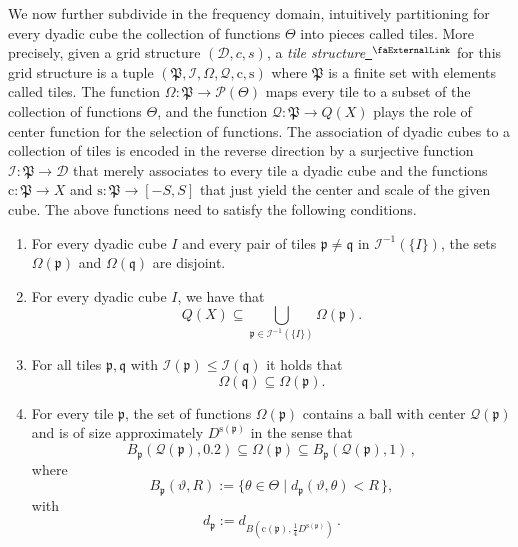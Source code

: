 \documentclass[12pt]{amsart}
\newcommand{\extlink}{~\ensuremath{{}^\text{\faExternalLink}}}
\theoremstyle{definition}
\theoremstyle{plain}
\newcommand{\pc}{{\mathrm{c}}}
\newcommand{\ps}{{\mathrm{s}}}
\newcommand{\fc}{{\Omega}}
\newcommand{\scI}{{\mathcal{I}}} %
\newcommand{\tQ}{{Q}}
\newcommand{\mfa}{{\vartheta}}
\newcommand{\mfb}{{\theta}}
\newcommand{\Mf}{{\Theta}}
\newcommand{\fcc}{{\mathcal{Q}}}
\newcommand{\fp}{{\mathfrak p}}
\newcommand{\fP}{{\mathfrak P}}
\newcommand{\fq}{{\mathfrak q}}
\begin{document}
We now further subdivide in the frequency domain, intuitively partitioning for every dyadic cube the collection of functions $\Theta$ into pieces called tiles. More precisely, given a grid structure $(\mathcal{D}, c, s)$, a \emph{tile structure}\href{https://github.com/fpvandoorn/carleson/blob/3e96104fa4cd6d5ff37434ac39c49604c86a7658/Carleson/TileStructure.lean#L54}{\extlink} for this grid structure is a tuple $(\fP,\scI,\fc,\fcc,\pc,\ps)$ where $\fP$ is a finite set with elements called tiles. The function $\fc\colon \fP \to \mathcal{P}(\Mf)$ maps every tile to a subset of the collection of functions $\Theta$, and the function $\fcc\colon \fP \to \tQ(X)$ plays the role of center function for the selection of functions. The association of dyadic cubes to a collection of tiles is encoded in the reverse direction by a surjective function $\scI: \fP \to \mathcal{D}$ that merely associates to every tile a dyadic cube and the functions $\pc\colon \fP \to X$ and $\ps\colon \fP \to [-S, S]$ that just yield the center and scale of the given cube. The above functions need to satisfy the following conditions.

\begin{enumerate}[label=\roman*.]
\item \label{it:omega-disjoint} For every dyadic cube $I$ and every pair of tiles $\fp \neq \fq$ in $\scI^{-1}(\{I\})$, the sets $\fc(\fp)$ and $\fc(\fq)$ are disjoint.
\item \label{it:omega-cover} For every dyadic cube $I$, we have that
\begin{equation}
    \tQ(X)\subseteq \bigcup_{\fp\in \scI^{-1}(\{I\})}\fc(\fp).
\end{equation}
\item For all tiles $\fp, \fq$ with $\scI(\fp) \le \scI(\fq)$ it holds that
\begin{equation}
    \fc(\fq)\subseteq \fc(\fp) .
\end{equation}
\item For every tile $\fp$, the set of functions $\fc(\fp)$ contains a ball with center $\fcc(\fp)$ and is of size approximately $D^{\ps(\fp)}$ in the sense that
\begin{equation}
    B_{\fp}(\fcc(\fp), 0.2) \subseteq \fc(\fp) \subseteq B_{\fp}(\fcc(\fp),1)\,,
\end{equation}
where
\begin{equation}
    B_{\fp} (\mfa, R) := \{\mfb \in \Mf \mid d_{\fp}(\mfa, \mfb) < R\,\} ,
\end{equation}
with
\begin{equation}
    d_{\fp} := d_{B(\pc(\fp),\frac 14 D^{\ps(\fp)})}\, .
\end{equation}
\end{enumerate}
\end{document}
